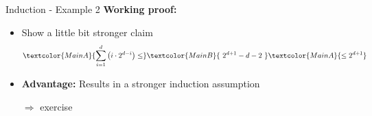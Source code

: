 
\begin{frame}{Induction - Example 2}
  \textbf{Working proof:}
  \begin{itemize}
    \item
      Show a {\color{MainB}little bit stronger} claim
      \begin{displaymath}
        \textcolor{MainA}{\sum_{i=1}^{d} \left(i \cdot 2^{d-i}\right) \leq}
        \textcolor{MainB}{~2^{d+1} - d - 2~}
        \textcolor{MainA}{\leq 2^{d+1}}
      \end{displaymath}
    \item<2- |handout:1>
      \textbf{Advantage:}
      Results in a stronger induction assumption
      \begin{center}
        \color{MainB}$\Rightarrow$ exercise
      \end{center}
  \end{itemize}
\end{frame}